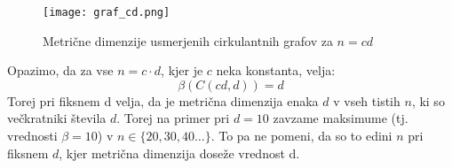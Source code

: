 \documentclass[a4paper,12pt]{article}
\theoremstyle{definition}
\theoremstyle{remark}
\theoremstyle{definition}
\begin{document}
\begin{figure}[H]  
    \centering
    \texttt{[image: graf\_cd.png]}  
    \caption{Metrične dimenzije usmerjenih cirkulantnih grafov za $n = cd$} 
    \label{fig:screenshot}  
\end{figure}

\noindent
Opazimo, da za vse $n = c \cdot d$, kjer je $c$ neka konstanta, velja:
\[
    \beta(C(cd, d)) = d
\]
\noindent
Torej pri fiksnem d velja, da je metrična dimenzija enaka $d$ v vseh tistih $n$, ki so večkratniki števila $d$.
Torej na primer pri $d = 10$ zavzame maksimume (tj. vrednosti $\beta = 10$) v $ n \in \{20, 30, 40 \dots\} $.
To pa ne pomeni, da so to edini $n$ pri fiksnem $d$, kjer metrična dimenzija doseže vrednost d. 
\end{document}
